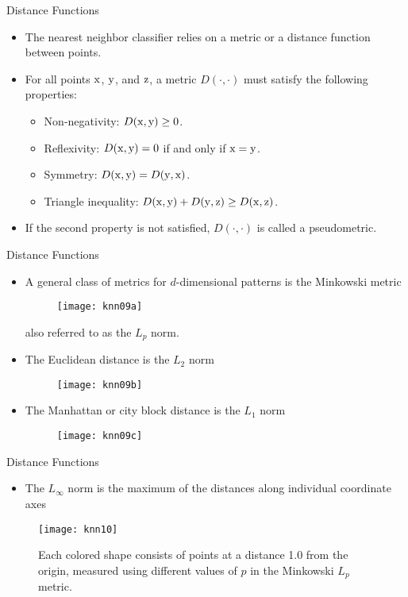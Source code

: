 \begin{frame}{Distance Functions}
\begin{itemize}
\item The nearest neighbor classifier relies on a {\color{mycolor2}metric} or a {\color{mycolor2}distance function} between points.
\item For all points ${\rm x}$, ${\rm y}$, and ${\rm z}$, a metric $D(\cdot,\cdot)$ must satisfy the following properties:
\begin{itemize}
\item Non-negativity: $D({\rm x},{\rm y})\geq 0$.
\item Reflexivity: $D({\rm x},{\rm y}) = 0$ if and only if ${\rm x}={\rm y}$.
\item Symmetry: $D({\rm x},{\rm y})=D({\rm y},{\rm x})$.
\item Triangle inequality: $D({\rm x},{\rm y})+D({\rm y},{\rm z})\geq D({\rm x},{\rm z})$.
\end{itemize}
\item If the second property is not satisfied, $D(\cdot,\cdot)$ is called a pseudometric.
\end{itemize}
\end{frame}

\begin{frame}{Distance Functions}
\begin{itemize}
\item A general class of metrics for $d$-dimensional patterns is the {\color{mycolor2}Minkowski metric}
\begin{figure}
\texttt{[image: knn09a]}
\end{figure}
also referred to as the $L_p$ norm.
\item The {\color{mycolor2}Euclidean distance} is the $L_2$ norm
\begin{figure}
\texttt{[image: knn09b]}
\end{figure}
\item The {\color{mycolor2}Manhattan} or {\color{mycolor2}city block} distance is the $L_1$ norm
\begin{figure}
\texttt{[image: knn09c]}
\end{figure}
\end{itemize}
\end{frame}

\begin{frame}{Distance Functions}
\begin{itemize}
\item The $L_{\infty}$ norm is the maximum of the distances along individual coordinate axes
\end{itemize}
\begin{figure}
\texttt{[image: knn10]}
\caption{Each colored shape consists of points at a distance 1.0 from the origin, measured using different values of $p$ in the Minkowski $L_p$ metric.}
\end{figure}
\end{frame}



